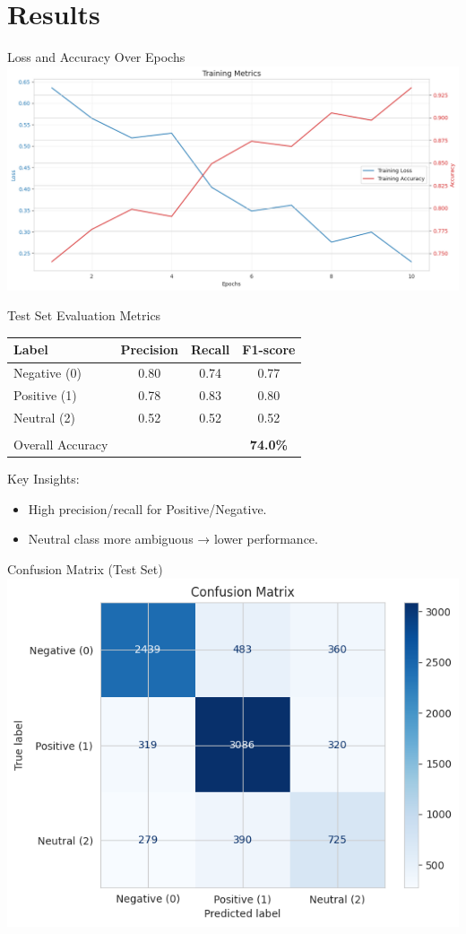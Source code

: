 \documentclass[aspectratio=169]{beamer}
\begin{document}
\section{Results}
\begin{frame}{Loss and Accuracy Over Epochs}
  \centering
  \includegraphics[width=0.75\linewidth]{training_metrics.png}
\end{frame}

\begin{frame}{Test Set Evaluation Metrics}
  \vspace{-0.5em}
  {\small
    \begin{tabular}{lccc}
      Label            & Precision & Recall & F1-score     \\
      \hline
      Negative (0)     & 0.80      & 0.74   & 0.77         \\
      Positive (1)     & 0.78      & 0.83   & 0.80         \\
      Neutral (2)      & 0.52      & 0.52   & 0.52         \\
      \\[-0.8em]
      Overall Accuracy &           &        & {\bf 74.0\%} \\
    \end{tabular}}

  \vspace{1em}

  Key Insights:
  \begin{itemize}
    \item High precision/recall for Positive/Negative.
    \item Neutral class more ambiguous → lower performance.
  \end{itemize}
\end{frame}

\begin{frame}{Confusion Matrix (Test Set)}
  \centering
  \includegraphics[width=0.55\linewidth]{confusion_matrix.png}
\end{frame}
\end{document}
